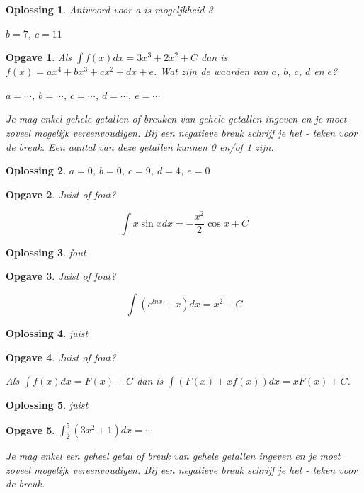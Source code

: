 \documentclass{article}
\newtheorem{opgave}{Opgave}
\newtheorem*{oplossing}{Oplossing}
\begin{document}
\begin{oplossing}
Antwoord voor a is mogeljkheid 3

\noindent $b=7$, $c=11$
\end{oplossing}

\begin{opgave}
Als $\int f(x)dx = 3x^3+2x^2+C$ dan is $f(x)=ax^4+bx^3+cx^2+dx+e$. Wat zijn de waarden van $a$, $b$, $c$, $d$ en $e$?\vspace{2mm}

\noindent $a= \cdots$, $b=\cdots$, $c=\cdots$, $d=\cdots$, $e=\cdots$ \vspace{1mm}

\noindent Je mag enkel gehele getallen of breuken van gehele getallen ingeven en je moet zoveel mogelijk vereenvoudigen. Bij een negatieve breuk schrijf je het - teken voor de breuk. Een aantal van deze getallen kunnen 0 en/of 1 zijn.
\end{opgave}

\begin{oplossing}
$a=0$, $b=0$, $c=9$, $d=4$, $e=0$
\end{oplossing}

\begin{opgave}
Juist of fout?

\[
\int x \sin x dx =-\frac{x^2}{2} \cos x +C
\]
\end{opgave}

\begin{oplossing}
fout
\end{oplossing}

\begin{opgave}
Juist of fout?

\[
\int (e^{lnx}+x)dx = x^2 +C
\]
\end{opgave}

\begin{oplossing}
juist
\end{oplossing}

\begin{opgave}
Juist of fout?

Als $\int f(x)dx=F(x)+C$ dan is $\int (F(x)+xf(x))dx = xF(x)+C$.
\end{opgave}

\begin{oplossing}
juist
\end{oplossing}

\begin{opgave}
$\int ^5_2 (3x^2+1)dx = \cdots$\vspace{1mm}

\noindent Je mag enkel een geheel getal of breuk van gehele getallen ingeven en je moet zoveel mogelijk vereenvoudigen. Bij een negatieve breuk schrijf je het - teken voor de breuk.
\end{opgave}
\end{document}
